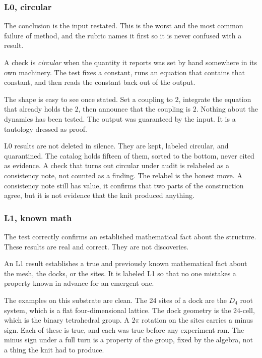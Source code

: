 \subsubsection{L0, circular}

The conclusion is the input restated. This is the worst and the most common failure of method, and the rubric names it first so it is never confused with a result.

\begin{definition}
A check is \emph{circular} when the quantity it reports was set by hand somewhere in its own machinery. The test fixes a constant, runs an equation that contains that constant, and then reads the constant back out of the output.
\end{definition}

The shape is easy to see once stated. Set a coupling to $2$, integrate the equation that already holds the $2$, then announce that the coupling is $2$. Nothing about the dynamics has been tested. The output was guaranteed by the input. It is a tautology dressed as proof.

L0 results are not deleted in silence. They are kept, labeled circular, and quarantined. The catalog holds fifteen of them, sorted to the bottom, never cited as evidence. A check that turns out circular under audit is relabeled as a consistency note, not counted as a finding. The relabel is the honest move. A consistency note still has value, it confirms that two parts of the construction agree, but it is not evidence that the knit produced anything.

\subsubsection{L1, known math}

The test correctly confirms an established mathematical fact about the structure. These results are real and correct. They are not discoveries.

\begin{result}
An L1 result establishes a true and previously known mathematical fact about the mesh, the docks, or the sites. It is labeled L1 so that no one mistakes a property known in advance for an emergent one.
\end{result}

The examples on this substrate are clean. The 24 sites of a dock are the $D_4$ root system, which is a flat four-dimensional lattice. The dock geometry is the 24-cell, which is the binary tetrahedral group. A $2\pi$ rotation on the sites carries a minus sign. Each of these is true, and each was true before any experiment ran. The minus sign under a full turn is a property of the group, fixed by the algebra, not a thing the knit had to produce.

